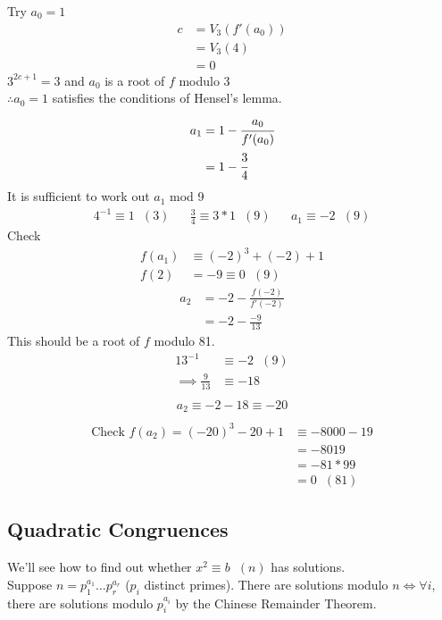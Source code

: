 \documentclass[11pt]{article}
\begin{document}
Try $a_0 = 1$
\begin{align*}
	c&= V_3(f'(a_0)) \\
	&=V_3(4) \\
	&=0
\end{align*}
$3^{2c+1} = 3 $ and $a_0$ is a root of $f$ modulo 3\\
$\therefore a_0 = 1 $ satisfies the conditions of Hensel's lemma.
\begin{align*}
	a_1 &= 1 - \cfrac{a_0}{f'(a_0)} \\
	& = 1 - \cfrac{3}{4}
\end{align*}
It is sufficient to work out $a_1$ mod 9
\begin{align*}
	4^{-1} \equiv 1 \hspace{7pt} (3) && \frac{3}{4} \equiv 3 *1 \hspace{7pt} (9) && a_1 \equiv -2 \hspace{7pt}(9)  
\end{align*}
Check 
\begin{align*}
	f(a_1) &\equiv (-2)^3 + (-2) + 1 \\
	f(2) &= -9 \equiv 0 \hspace{7pt} (9)
\end{align*}
\begin{align*}
	a_2 &= -2 - \frac{f(-2)}{f'(-2)}\\
	&= -2 - \frac{-9}{13}
\end{align*}
This should be a root of $f$ modulo 81. 
\begin{align*}
	13^{-1} &\equiv -2\hspace{7pt} (9)\\[1em]
	\implies \frac{9}{13} &\equiv -18 \\
\end{align*}
\begin{align*}
	a_2 \equiv -2 -18 \equiv -20\\
\end{align*}
\begin{align*}
	\text{Check } f(a_2) = (-20)^3 -20 +1 &\equiv -8000 -19 \\
	&= -8019\\ 
	&= -81*99\\
	&=0\hspace{7pt} (81)
\end{align*}
\newpage
\subsection{Quadratic Congruences}
We'll see how to find out whether $x^2 \equiv b \hspace{7pt} (n) $ has solutions.\\[0.5em]
Suppose $n= p_1^{a_1} \dots p_r^{a_r}$ ($p_i$ distinct primes). There are solutions modulo $n \iff \forall i$, there are solutions modulo $p_i^{a_i}$ by the Chinese Remainder Theorem.
	
\end{document}
